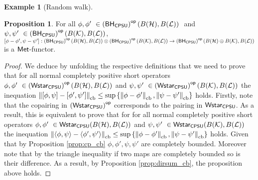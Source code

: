 \documentclass[10pt,a4paper]{amsart}
\theoremstyle{definition}
\theoremstyle{definition}
\newtheorem{example}[definition]{Example}
\theoremstyle{definition}
\theoremstyle{definition}
\newtheorem{proposition}[definition]{Proposition}
\theoremstyle{definition}
\theoremstyle{definition}
\begin{document}
\begin{example}[Random walk]
\begin{comment}
\begin{proof}
  Similarly to  \cite[ Proof of proposition 4.1]{dahlqvist2023syntactic}, in order to prove that $\WstarCPSUop$ is $\catMet$-enriched, it suffices to establish that for normal completely positive subunital maps $\phi: B(\mathcal{H_1}) \rightarrow B(\mathcal{H_2})$  and $\psi: B(\mathcal{K_1}) \rightarrow B(\mathcal{K_2})$, $\cbnorm{\phi \cdot \psi} \leq \phi$ and  $\cbnorm{\phi \cdot \psi} \leq \psi$. This follows directly from Lemma \ref{lem:cb_comp_submult} and the fact that all subunital maps are contractive.
Next, regarding $\bar{\otimes}$, the inequations $\cbnorm{\phi \, \bar{\otimes} \id}  \leq \cbnorm{\phi}$ and  $ \cbnorm{\id \, \bar{\otimes}  \phi} \leq \cbnorm{\phi}$ are  sufficient conditions to prove the second part of the proposition. There inequations follow from Propositions \ref{prop:eqs_id_cb} and \ref{prop:dirsum_cb}.
\end{proof}

\end{comment}



\begin{proposition} \label{prop:cb_cop_functor}
  For all $\phi, \phi' \in \BHCPSUop(B(\mathcal{H}),B(\mathcal{L}))  $ and $\psi, \psi' \in \BHCPSUop(B(\mathcal{K}),B(\mathcal{L})) $, $[\phi-\phi',\psi-\psi']:\left(\mathsf{BH_{CPSU}}\right)^{\mathsf{op}}(B(\mathcal{H}),B(\mathcal{L})) \otimes \left(\mathsf{BH_{CPSU}}\right)^{\mathsf{op}}(B(\mathcal{K}),B(\mathcal{L})) \rightarrow \left(\mathsf{BH_{CPSU}}\right)^{\mathsf{op}}(B(\mathcal{H}) \oplus B(\mathcal{K}), B(\mathcal{L})) $ is a $\mathsf{Met}$-functor.
\end{proposition}
  
\begin{proof}
  We deduce by unfolding the respective definitions that we need to prove that for all normal completely positive short operators $\phi, \phi' \in \WstarCPSUop(B(\mathcal{H}),B(\mathcal{L}))  $ and $\psi, \psi' \in \WstarCPSUop(B(\mathcal{K}),B(\mathcal{L}))$ the inequation $\left\lVert [\phi, \psi] - [\phi', \psi'] \right\rVert_{\text{cb}} \leq  \sup \left\{ \left\lVert \phi-\phi' \right\rVert_{\text{cb}}, \left\lVert \psi-\psi' \right\rVert_{\text{cb}} \right\}$ holds.
  Firstly, note that the copairing in $\left(\mathsf{Wstar_{CPSU}}\right)^{\mathsf{op}}$ corresponds to the pairing in $\mathsf{Wstar_{CPSU}}$. As a result, this is equivalent to prove that for for all normal completely positive short operators $\phi, \phi' \in \WstarCPSU(B(\mathcal{H}),B(\mathcal{L}))  $ and $\psi, \psi' \in \WstarCPSU(B(\mathcal{K}),B(\mathcal{L}))$ the inequation $\left\lVert \langle \phi, \psi \rangle - \langle \phi', \psi'\rangle \right\rVert_{\text{cb}} \leq  \sup \left\{ \left\lVert \phi-\phi' \right\rVert_{\text{cb}}, \left\lVert \psi-\psi' \right\rVert_{\text{cb}} \right\}$ holds. Given that by Proposition \ref{prop:cp_cb} $\phi, \phi', \psi, \psi'$ are completely bounded. Moreover note that by the triangle inequality if two maps are completely bounded so is their difference. As a result, by Proposition \ref{prop:dirsum_cb}, the proposition above holds.
\end{proof}


\end{example}
\end{document}
